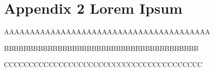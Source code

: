 
%


\chapter{Appendix 2 Lorem Ipsum}
\label{app:lorem_ipsum2}


\begin{newpdflayout}{210mm}{297mm}%

AAAAAAAAAAAAAAAAAAAAAAAAAAAAAAAAAAAAAAAA

\lipsum[1-1]

BBBBBBBBBBBBBBBBBBBBBBBBBBBBBBBBBBBBBBBB
\end{newpdflayout}

CCCCCCCCCCCCCCCCCCCCCCCCCCCCCCCCCCCCCCCC

\lipsum[1-1]
